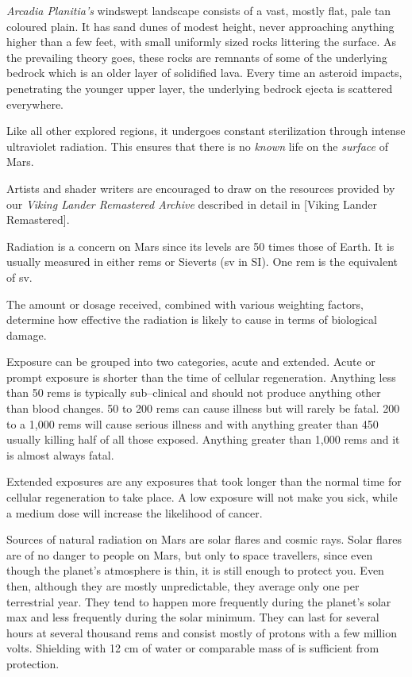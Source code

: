 {\it Arcadia Planitia's} windswept landscape consists of a vast, mostly flat, pale tan coloured plain. It has sand dunes of modest height, never approaching anything higher than a few feet, with small uniformly sized rocks littering the surface. As the prevailing theory goes, these rocks are remnants of some of the underlying bedrock which is an older layer of solidified lava. Every time an asteroid impacts, penetrating the younger upper layer, the underlying bedrock ejecta is scattered everywhere.

Like all other explored regions, it undergoes constant sterilization through intense ultraviolet radiation. This ensures that there is no {\it known} life on the {\it surface} of Mars.

Artists and shader writers are encouraged to draw on the resources provided by our {\it Viking Lander Remastered Archive} described in detail in [Viking Lander Remastered].


Radiation is a concern on Mars since its levels are 50 times those of Earth. It is usually measured in either rems or Sieverts (sv in SI). One rem is the equivalent of  sv.

The amount or dosage received, combined with various weighting factors, determine how effective the radiation is likely to cause in terms of biological damage.

Exposure can be grouped into two categories, acute and extended. Acute or prompt exposure is shorter than the time of cellular regeneration. Anything less than 50 rems is typically sub--clinical and should not produce anything other than blood changes. 50 to 200 rems can cause illness but will rarely be fatal. 200 to a 1,000 rems will cause serious illness and with anything greater than 450 usually killing half of all those exposed. Anything greater than 1,000 rems and it is almost always fatal.

Extended exposures are any exposures that took longer than the normal time for cellular regeneration to take place. A low exposure will not make you sick, while a medium dose will increase the likelihood of cancer.

Sources of natural radiation on Mars are solar flares and cosmic rays. Solar flares are of no danger to people on Mars, but only to space travellers, since even though the planet's atmosphere is thin, it is still enough to protect you. Even then, although they are mostly unpredictable, they average only one per terrestrial year. They tend to happen more frequently during the planet's solar max and less frequently during the solar minimum. They can last for several hours at several thousand rems and consist mostly of protons with a few million volts. Shielding with 12 cm of water or comparable mass of  is sufficient from protection.

